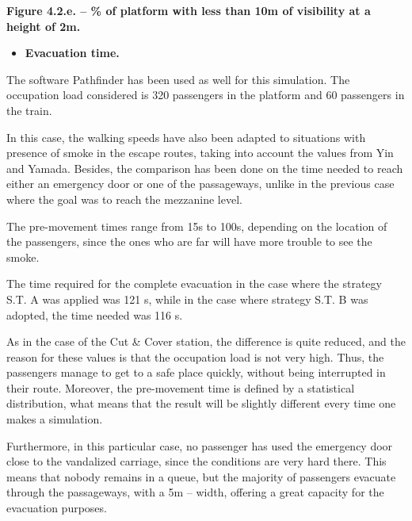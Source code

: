 \documentclass{article}
\begin{document}
\begin{mdcenter}%

\noindent{}\textbf{Figure 4.2.e. – \% of platform with less than 10m of visibility at a height of 2m.}%
\end{mdcenter}%

\begin{itemize}[noitemsep,topsep=\mdcompacttopsep]%

\item{}\textbf{Evacuation time.}%
\end{itemize}%

\noindent{}The software Pathfinder has been used as well for this simulation. The occupation 
load considered is 320 passengers in the platform and 60 passengers in the train.%

In this case, the walking speeds have also been adapted to situations with 
presence of smoke in the escape routes, taking into account the values from 
Yin and Yamada. Besides, the comparison has been done on the time needed to 
reach either an emergency door or one of the passageways, unlike in the previous 
case where the goal was to reach the mezzanine level.%

The pre-movement times range from 15s to 100s, depending on the location of the 
passengers, since the ones who are far will have more trouble to see the smoke.%

The time required for the complete evacuation in the case where the strategy 
S.T. A was applied was 121 s, while in the case where strategy S.T. B was adopted, 
the time needed was 116 s.%

As in the case of the Cut \& Cover station, the difference is quite reduced, and the 
reason for these values is that the occupation load is not very high. Thus, the 
passengers manage to get to a safe place quickly, without being interrupted in their 
route. Moreover, the pre-movement time is defined by a statistical distribution, what 
means that the result will be slightly different every time one makes a simulation.%

Furthermore, in this particular case, no passenger has used the emergency door close 
to the vandalized carriage, since the conditions are very hard there. This means that 
nobody remains in a queue, but the majority of passengers evacuate through the 
passageways, with a 5m – width, offering a great capacity for the evacuation purposes.%
\end{document}
